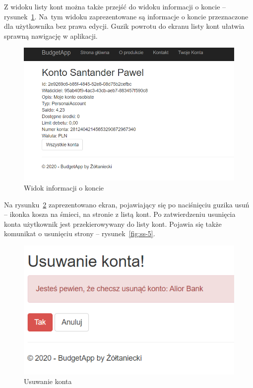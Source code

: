 Z widoku listy kont można także przejść do widoku informacji o koncie -- rysunek~\ref{fig:ss-3}. Na~tym widoku zaprezentowane są informacje o koncie przeznaczone dla użytkownika bez prawa edycji. Guzik powrotu do ekranu listy kont ułatwia sprawną nawigację w aplikacji.

\begin{figure}[ht]
	\centering
	\includegraphics[scale=.35]{rys04/konto-info.PNG}
	\caption{Widok informacji o koncie}
	\label{fig:ss-3}
\end{figure}

Na rysunku~\ref{fig:ss-4} zaprezentowano ekran, pojawiający się po naciśnięciu guzika usuń -- ikonka kosza na śmieci, na stronie z listą kont. Po zatwierdzeniu usunięcia konta użytkownik jest przekierowywany do listy kont. Pojawia się także komunikat o usunięciu strony -- rysunek~\ref{fig:ss-5}.

\begin{figure}[ht]
	\centering
\includegraphics[scale=.35]{rys04/usun-konto.PNG}
	\caption{Usuwanie konta}
	\label{fig:ss-4}
\end{figure}

